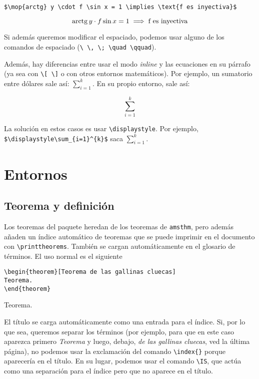 \documentclass[nochap]{apuntes}
\begin{document}
\begin{center}
\verb|$\mop{arctg} y \cdot f \sin x = 1 \implies \text{f es inyectiva}$|
\end{center}

\[ \mathrm{arctg}\, y \cdot f \sin x = 1 \implies \text{f es inyectiva} \]

Si además queremos modificar el espaciado, podemos usar alguno de los comandos de espaciado (\verb|\ \, \; \quad \qquad|).

Además, hay diferencias entre usar el modo \textit{inline} y las ecuaciones en su párrafo (ya sea con \verb|\[ \]| o con otros entornos matemáticos). Por ejemplo, un sumatorio entre dólares sale así: $\sum_{i=1}^{k}$. En su propio entorno, sale así:

\[ \sum_{i=1}^{k} \]

La solución en estos casos es usar \verb|\displaystyle|. Por ejemplo, \verb|$\displaystyle\sum_{i=1}^{k}$| saca $\displaystyle\sum_{i=1}^{k}$.

\section{Entornos}
\subsection{Teorema y definición}

Los teoremas del paquete heredan de los teoremas de \texttt{amsthm}, pero además añaden un índice automático de teoremas que se puede imprimir en el documento con \verb|\printtheorems|. También se cargan automáticamente en el glosario de términos. El uso normal es el siguiente

\begin{verbatim}
\begin{theorem}[Teorema de las gallinas cluecas]
Teorema.
\end{theorem}
\end{verbatim}

\begin{theorem}
Teorema.
\end{theorem}

El título se carga automáticamente como una entrada para el índice. Si, por lo que sea, queremos separar los términos (por ejemplo, para que en este caso aparezca primero \textit{Teorema} y luego, debajo, \textit{de las gallinas cluecas}, ved la última página), no podemos usar la exclamación del comando \verb|\index{}| porque aparecería en el título. En su lugar, podemos usar el comando \verb|\IS|, que actúa como una separación para el índice pero que no aparece en el título.
\end{document}
